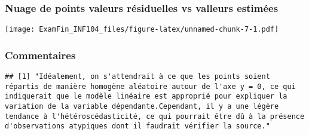 \documentclass[
]{article}
\begin{document}
\hypertarget{nuage-de-points-valeurs-ruxe9siduelles-vs-valleurs-estimuxe9es}{%
\subsubsection{Nuage de points valeurs résiduelles vs valleurs
estimées}\label{nuage-de-points-valeurs-ruxe9siduelles-vs-valleurs-estimuxe9es}}

\texttt{[image: ExamFin\_INF104\_files/figure-latex/unnamed-chunk-7-1.pdf]}

\hypertarget{commentaires}{%
\subsubsection{Commentaires}\label{commentaires}}

\begin{verbatim}
## [1] "Idéalement, on s'attendrait à ce que les points soient répartis de manière homogène aléatoire autour de l'axe y = 0, ce qui indiquerait que le modèle linéaire est approprié pour expliquer la variation de la variable dépendante.Cependant, il y a une légère tendance à l'hétéroscédasticité, ce qui pourrait être dû à la présence d'observations atypiques dont il faudrait vérifier la source."
\end{verbatim}
\end{document}
